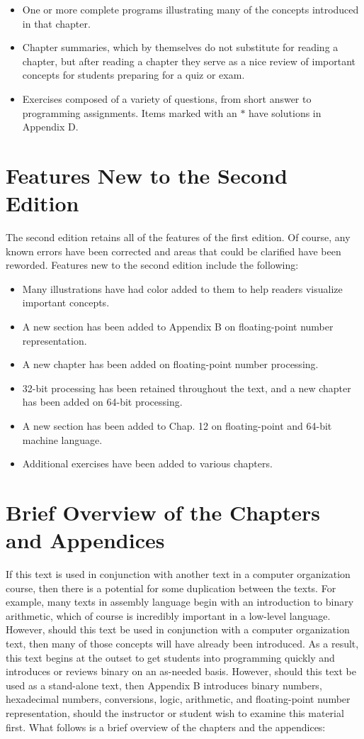 \documentclass[10pt]{book}
\begin{document}
\begin{itemize}
  \item One or more complete programs illustrating many of the concepts introduced in that chapter.
  \item Chapter summaries, which by themselves do not substitute for reading a chapter, but after reading a chapter they serve as a nice review of important concepts for students preparing for a quiz or exam.
  \item Exercises composed of a variety of questions, from short answer to programming assignments. Items marked with an $*$ have solutions in Appendix D.
\end{itemize}
\section{Features New to the Second Edition}
The second edition retains all of the features of the first edition. Of course, any known errors have been corrected and areas that could be clarified have been reworded. Features new to the second edition include the following:

\begin{itemize}
  \item Many illustrations have had color added to them to help readers visualize important concepts.
  \item A new section has been added to Appendix B on floating-point number representation.
  \item A new chapter has been added on floating-point number processing.
  \item 32-bit processing has been retained throughout the text, and a new chapter has been added on 64-bit processing.
  \item A new section has been added to Chap. 12 on floating-point and 64-bit machine language.
  \item Additional exercises have been added to various chapters.
\end{itemize}

\section{Brief Overview of the Chapters and Appendices}
If this text is used in conjunction with another text in a computer organization course, then there is a potential for some duplication between the texts. For example, many texts in assembly language begin with an introduction to binary arithmetic, which of course is incredibly important in a low-level language. However, should this text be used in conjunction with a computer organization text, then many of those concepts will have already been introduced. As a result, this text begins at the outset to get students into programming quickly and introduces or reviews binary on an as-needed basis. However, should this text be used as a stand-alone text, then Appendix B introduces binary numbers, hexadecimal numbers, conversions, logic, arithmetic, and floating-point number representation, should the instructor or student wish to examine this material first. What follows is a brief overview of the chapters and the appendices:
\end{document}
